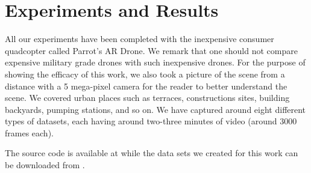 



\section{Experiments and Results}

All our experiments have been completed with the inexpensive consumer
quadcopter called Parrot's AR Drone. We remark that one should not
compare expensive military grade drones with such inexpensive drones.
For the purpose of showing the efficacy of this work, we also took a
picture of the scene from a distance with a 5 mega-pixel camera for
the reader to better understand the scene.  We covered urban places
such as terraces, constructions sites, building backyards,
pumping stations, and so on.  We have captured around eight different
types of datasets, each having around two-three minutes of video
(around 3000 frames each). 

The source code is available at \cite{code} while the data sets we
created for this work can be downloaded from \cite{datasets}.

